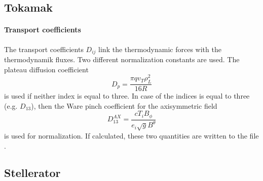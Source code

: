 \subsection{Tokamak}

\paragraph{Transport coefficients}
The transport coefficients $D_{ij}$ link the thermodynamic forces with
the thermodynamik fluxes. Two different normalization constants are
used.
The plateau diffusion coefficient
\begin{equation}
  D_p = \frac{\pi q v_T \rho_L^2}{16 R}
\end{equation}
is used if neither index is equal to three. In case of the indices is
equal to three (e.g. $D_{13}$), then the Ware pinch coefficient  for the
axisymmetric field
\begin{equation}
  D_{13}^{AX} = \frac{cT_i B_{\phi}}{e_i \sqrt{g} B^{\theta}}
\end{equation}
is used for normalization.
If calculated, these two quantities are written to the file
.


\subsection{Stellerator}

